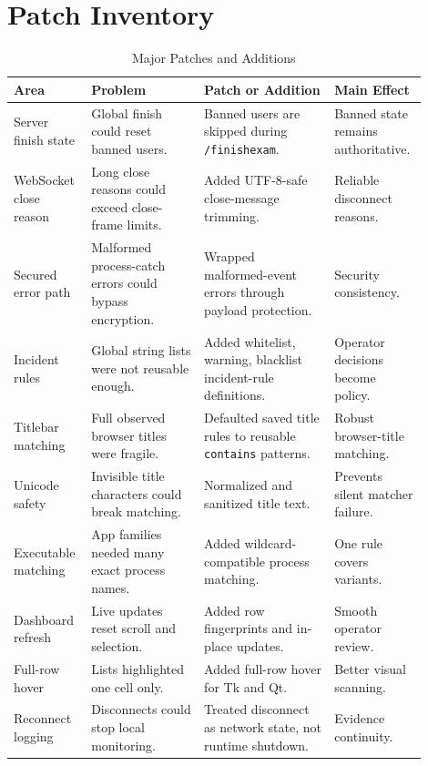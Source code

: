 \documentclass[conference]{IEEEtran}
\begin{document}
\section{Patch Inventory}

\begin{table}[htbp]
\caption{Major Patches and Additions}
\centering
\begin{tabular}{P{0.16\linewidth} P{0.26\linewidth} P{0.30\linewidth} P{0.18\linewidth}}
\toprule
\textbf{Area} & \textbf{Problem} & \textbf{Patch or Addition} & \textbf{Main Effect} \\
\midrule
Server finish state & Global finish could reset banned users. & Banned users are skipped during \texttt{/finishexam}. & Banned state remains authoritative. \\
\midrule
WebSocket close reason & Long close reasons could exceed close-frame limits. & Added UTF-8-safe close-message trimming. & Reliable disconnect reasons. \\
\midrule
Secured error path & Malformed process-catch errors could bypass encryption. & Wrapped malformed-event errors through payload protection. & Security consistency. \\
\midrule
Incident rules & Global string lists were not reusable enough. & Added whitelist, warning, blacklist incident-rule definitions. & Operator decisions become policy. \\
\midrule
Titlebar matching & Full observed browser titles were fragile. & Defaulted saved title rules to reusable \texttt{contains} patterns. & Robust browser-title matching. \\
\midrule
Unicode safety & Invisible title characters could break matching. & Normalized and sanitized title text. & Prevents silent matcher failure. \\
\midrule
Executable matching & App families needed many exact process names. & Added wildcard-compatible process matching. & One rule covers variants. \\
\midrule
Dashboard refresh & Live updates reset scroll and selection. & Added row fingerprints and in-place updates. & Smooth operator review. \\
\midrule
Full-row hover & Lists highlighted one cell only. & Added full-row hover for Tk and Qt. & Better visual scanning. \\
\midrule
Reconnect logging & Disconnects could stop local monitoring. & Treated disconnect as network state, not runtime shutdown. & Evidence continuity. \\
\midrule

\end{tabular}
\end{table}
\end{document}
